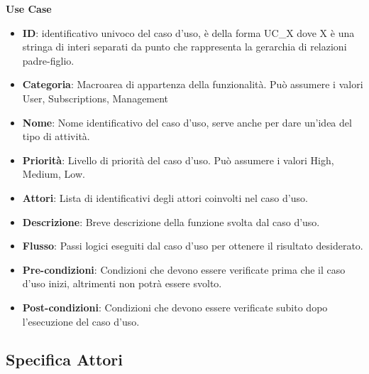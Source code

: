 \noindent \large{\textbf{Use Case}} \\
\begin{itemize}[]
	\item \textbf{ID}: identificativo univoco del caso d'uso, è della forma UC\_X dove X è una stringa di interi separati da punto che rappresenta la gerarchia di relazioni padre-figlio.
	\item \textbf{Categoria}: Macroarea di appartenza della funzionalità. Può assumere i valori {User, Subscriptions, Management}
	\item \textbf{Nome}: Nome identificativo del caso d'uso, serve anche per dare un'idea del tipo di attività.
	\item \textbf{Priorità}: Livello di priorità del caso d'uso. Può assumere i valori {High, Medium, Low}. 
	\item \textbf{Attori}: Lista di identificativi degli attori coinvolti nel caso d'uso.
	\item \textbf{Descrizione}: Breve descrizione della funzione svolta dal caso d'uso.
	\item \textbf{Flusso}: Passi logici eseguiti dal caso d'uso per ottenere il risultato desiderato.
	\item \textbf{Pre-condizioni}: Condizioni che devono essere verificate prima che il caso d'uso inizi, altrimenti non potrà essere svolto.
	\item \textbf{Post-condizioni}: Condizioni che devono essere verificate subito dopo l'esecuzione del caso d'uso.

\end{itemize}


\subsection{Specifica Attori}

